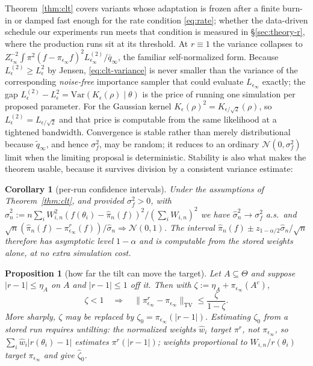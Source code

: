 \documentclass[pdflatex,sn-mathphys-num]{sn-jnl}
\theoremstyle{plain}
\newtheorem{proposition}[theorem]{Proposition}
\newtheorem{corollary}[theorem]{Corollary}
\theoremstyle{definition}
\begin{document}
\begin{appendices}
Theorem~\ref{thm:clt} covers variants whose adaptation is frozen after a finite burn-in or damped fast enough for the rate condition \eqref{eq:rate}; whether the data-driven schedule our experiments run meets that condition is measured in \S\ref{sec:theory-r}, where the production runs sit at its threshold. At $r\equiv1$ the variance collapses to $Z_{\epsilon_\infty}^{-2}\int\pi^2(f-\pi_{\epsilon_\infty}f)^2L^{(2)}_{\epsilon_\infty}/\bar q_\infty$, the familiar self-normalized form. Because $L^{(2)}_\epsilon\ge L^2_\epsilon$ by Jensen, \eqref{eq:clt-variance} is never smaller than the variance of the corresponding \emph{noise-free} importance sampler that could evaluate $L_{\epsilon_\infty}$ exactly; the gap $L^{(2)}_\epsilon-L^2_\epsilon=\mathrm{Var}(K_\epsilon(\rho)\mid\theta)$ is the price of running one simulation per proposed parameter. For the Gaussian kernel $K_\epsilon(\rho)^2=K_{\epsilon/\sqrt2}(\rho)$, so $L^{(2)}_\epsilon=L_{\epsilon/\sqrt2}$ and that price is computable from the same likelihood at a tightened bandwidth. Convergence is stable rather than merely distributional because $\tilde q_\infty$, and hence $\sigma^2_f$, may be random; it reduces to an ordinary $\mathcal{N}(0,\sigma^2_f)$ limit when the limiting proposal is deterministic. Stability is also what makes the theorem usable, because it survives division by a consistent variance estimate:

\begin{corollary}[per-run confidence intervals]\label{cor:ci}
Under the assumptions of Theorem~\ref{thm:clt}, and provided $\sigma^2_f>0$, with
$\widehat\sigma_n^2 := n\sum_i W_{i,n}^2(f(\theta_i)-\widehat\pi_n(f))^2 / (\sum_i W_{i,n})^2$
we have $\widehat\sigma^2_n\to\sigma^2_f$ a.s.\ and $\sqrt n(\widehat\pi_n(f)-\pi^r_{\epsilon_\infty}(f))/\widehat\sigma_n\Rightarrow\mathcal{N}(0,1)$. The interval $\widehat\pi_n(f)\pm z_{1-\alpha/2}\widehat\sigma_n/\sqrt n$ therefore has asymptotic level $1-\alpha$ and is computable from the stored weights alone, at no extra simulation cost.
\end{corollary}

\begin{proposition}[how far the tilt can move the target]\label{prop:tilt}
Let $A\subseteq\Theta$ and suppose $|r-1|\le\eta_A$ on $A$ and $|r-1|\le1$ off it. Then with $\zeta:=\eta_A+\pi_{\epsilon_\infty}(A^c)$,
\begin{equation}
\zeta<1\quad\Longrightarrow\quad\bigl\|\pi^r_{\epsilon_\infty}-\pi_{\epsilon_\infty}\bigr\|_{\mathrm{TV}}\le\frac{\zeta}{1-\zeta}.
\label{eq:tilt-bound}
\end{equation}
More sharply, $\zeta$ may be replaced by $\zeta_0=\pi_{\epsilon_\infty}(|r-1|)$. Estimating $\zeta_0$ from a stored run requires \emph{untilting}: the normalized weights $\widehat w_i$ target $\pi^r$, not $\pi_{\epsilon_\infty}$, so $\sum_i\widehat w_i|r(\theta_i)-1|$ estimates $\pi^r(|r-1|)$; weights proportional to $W_{i,n}/r(\theta_i)$ target $\pi_{\epsilon_\infty}$ and give $\widehat\zeta_0$.
\end{proposition}


\end{appendices}
\end{document}
